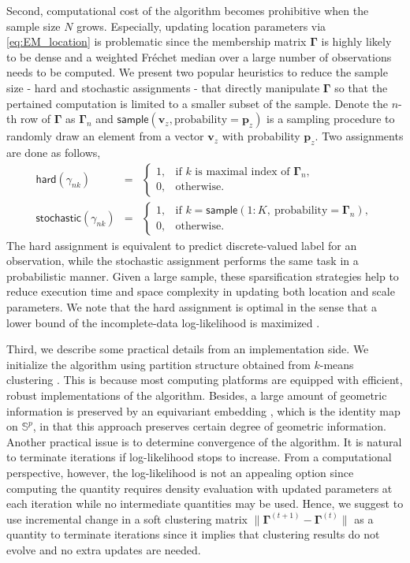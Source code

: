 \documentclass[10pt]{article}
\newcommand{\bfGamma}{\mathbf{\Gamma}}
\newcommand{\bbS}{\mathbb{S}}
\newcommand{\Frechet}{Fr\'{e}chet }
\begin{document}
Second, computational cost of the algorithm becomes prohibitive when the sample size $N$ grows. Especially, updating location parameters via \eqref{eq:EM_location} is problematic since the membership matrix $\bfGamma$ is highly likely to be dense and a weighted \Frechet median over a large number of observations needs to be computed. We present two popular heuristics to reduce the sample size - hard and stochastic assignments - that directly manipulate $\bfGamma$ so that the pertained computation is limited to a smaller subset of the sample. Denote the $n$-th row of $\bfGamma$ as $\bfGamma_n$ and $\textsf{sample}(\mathbf{v}_z, \textrm{probability}=\mathbf{p}_z)$ is a sampling procedure to randomly draw an element from a vector  $\mathbf{v}_z$ with probability $\mathbf{p}_z$.  Two  assignments are done as follows,
\begin{eqnarray}
\textsf{hard}(\gamma_{nk}) &=& \begin{cases}
1, &\textrm{if $k$ is maximal index of $\bfGamma_n$,}\\0, &\textrm{otherwise}.
\end{cases} \label{eq:heuristic_hard}	\\
\textsf{stochastic}(\gamma_{nk}) &=& \begin{cases}
1, &\textrm{if $k=\textsf{sample}(1:K, ~\textrm{probability}=\bfGamma_n)$},\\
0, &\textrm{otherwise}. \label{eq:heuristic_stochastic}
\end{cases}
\end{eqnarray}
The hard assignment is equivalent to predict discrete-valued label for an observation, while the stochastic assignment performs the same task in a probabilistic manner. Given a large sample, these sparsification strategies help to reduce execution time and space complexity in updating both location and scale parameters. We note that the hard assignment is optimal in the sense that a lower bound of the incomplete-data log-likelihood is maximized \cite{banerjee_2005_ClusteringUnitHypersphere}. 


Third, we describe some practical details from an implementation side. We initialize the algorithm using partition structure obtained from $k$-means clustering \cite{macqueen_1967_MethodsClassificationAnalysis}. This is because most computing platforms are equipped with efficient, robust implementations of the algorithm. Besides, a large amount of geometric information is preserved by an equivariant embedding \cite{bhattacharya_2012_NonparametricInferenceManifolds}, which is the identity map on $\bbS^p$, in that this approach preserves certain degree of geometric information. Another practical issue is to determine convergence of the algorithm. It is natural to terminate iterations if log-likelihood stops to increase. From a computational perspective, however, the log-likelihood is not an appealing option since computing the quantity requires density evaluation with updated parameters at each iteration while no intermediate quantities may be used. Hence, we suggest to use incremental change in a soft clustering matrix $\|\bfGamma^{(t+1)} - \bfGamma^{(t)}\|$ as a quantity to terminate iterations since it implies that clustering results do not evolve and no extra updates are needed.
\end{document}
